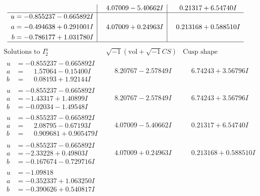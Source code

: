 \documentclass[1p]{elsarticle_modified}
\theoremstyle{definition}
\newcommand{\I}{\sqrt{-1}}
\begin{document}
$$\begin{array}{c|c|c}
 & \phantom{-}4.07009 - 5.40662 I & \phantom{-}0.21317 + 6.54740 I \\ \hline\begin{aligned}
u &= -0.855237 - 0.665892 I \\
a &= -0.494638 + 0.291001 I \\
b &= -0.786177 + 1.031780 I\end{aligned}
 & \phantom{-}4.07009 + 0.24963 I & \phantom{-}0.213168 + 0.588510 I\\
 \hline 
 \end{array}$$\newpage$$\begin{array}{c|c|c}  
\text{Solutions to }I^u_{2}& \I (\text{vol} + \sqrt{-1}CS) & \text{Cusp shape}\\
 \hline 
\begin{aligned}
u &= -0.855237 - 0.665892 I \\
a &= \phantom{-}1.57064 - 0.15400 I \\
b &= \phantom{-}0.08193 + 1.92144 I\end{aligned}
 & \phantom{-}8.20767 - 2.57849 I & \phantom{-}6.74243 + 3.56796 I \\ \hline\begin{aligned}
u &= -0.855237 - 0.665892 I \\
a &= -1.43317 + 1.40899 I \\
b &= -0.02034 - 1.49548 I\end{aligned}
 & \phantom{-}8.20767 - 2.57849 I & \phantom{-}6.74243 + 3.56796 I \\ \hline\begin{aligned}
u &= -0.855237 - 0.665892 I \\
a &= \phantom{-}2.08795 - 0.67193 I \\
b &= \phantom{-}0.909681 + 0.905479 I\end{aligned}
 & \phantom{-}4.07009 - 5.40662 I & \phantom{-}0.21317 + 6.54740 I \\ \hline\begin{aligned}
u &= -0.855237 - 0.665892 I \\
a &= -2.33228 + 0.49803 I \\
b &= -0.167674 - 0.729716 I\end{aligned}
 & \phantom{-}4.07009 + 0.24963 I & \phantom{-}0.213168 + 0.588510 I \\ \hline\begin{aligned}
u &= -1.09818\phantom{ +0.000000I} \\
a &= -0.352337 + 1.063250 I \\
b &= -0.390626 + 0.540817 I\end{aligned}

\end{array}$$
\end{document}
